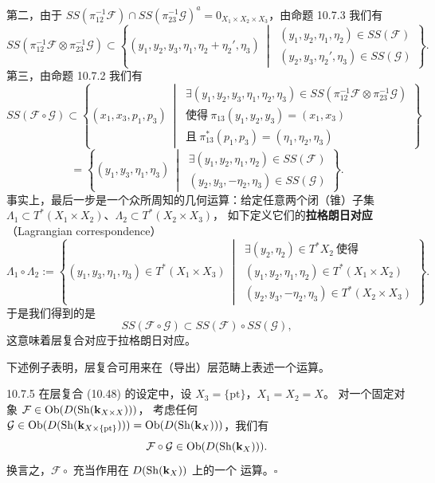 第二，由于 $SS(\pi_{12}^{-1}\mathcal F)\cap SS(\pi_{23}^{-1}\mathcal G)^a
=0_{X_1\times X_2\times X_3}$，由命题 10.7.3 我们有
\[
  SS(\pi_{12}^{-1}\mathcal F\otimes\pi_{23}^{-1}\mathcal G)\subset
  \left\{(y_1,y_2,y_3,\eta_1,\eta_2+\eta_2',\eta_3)\ \middle|\
  \begin{array}{l}
    (y_1,y_2,\eta_1,\eta_2)\in SS(\mathcal F)\\
    (y_2,y_3,\eta_2',\eta_3)\in SS(\mathcal G)
  \end{array}\right\}.
\]
第三，由命题 10.7.2 我们有
\[
  SS(\mathcal F\circ\mathcal G)\subset\left\{
  (x_1,x_3,p_1,p_3)\ \middle|\
  \begin{array}{l}
    \exists(y_1,y_2,y_3,\eta_1,\eta_2,\eta_3)
    \in SS(\pi_{12}^{-1}\mathcal F\otimes\pi_{23}^{-1}\mathcal G)\\
    \text{使得}\ \pi_{13}(y_1,y_2,y_3)=(x_1,x_3)\\
    \text{且}\ \pi_{13}^*(p_1,p_3)=(\eta_1,\eta_2,\eta_3)
  \end{array}\right\}
\]
\[
  =\left\{(y_1,y_3,\eta_1,\eta_3)\ \middle|\
  \begin{array}{l}
    \exists(y_1,y_2,\eta_1,\eta_2)\in SS(\mathcal F)\\
    (y_2,y_3,-\eta_2,\eta_3)\in SS(\mathcal G)
  \end{array}\right\}.
\]
事实上，最后一步是一个众所周知的几何运算：给定任意两个闭（锥）子集
$\Lambda_1\subset T^*(X_1\times X_2)$、$\Lambda_2\subset T^*(X_2\times X_3)$，
如下定义它们的\textbf{拉格朗日对应}（Lagrangian correspondence）
\begin{equation}\tag{10.49}
  \Lambda_1\circ\Lambda_2:=\left\{
  (y_1,y_3,\eta_1,\eta_3)\in T^*(X_1\times X_3)\ \middle|\
  \begin{array}{l}
    \exists(y_2,\eta_2)\in T^*X_2\ \text{使得}\\
    (y_1,y_2,\eta_1,\eta_2)\in T^*(X_1\times X_2)\\
    (y_2,y_3,-\eta_2,\eta_3)\in T^*(X_2\times X_3)
  \end{array}\right\}.
\end{equation}
于是我们得到的是
\begin{equation}\tag{10.50}
  SS(\mathcal F\circ\mathcal G)\subset SS(\mathcal F)\circ SS(\mathcal G),
\end{equation}
这意味着层复合对应于拉格朗日对应。

下述例子表明，层复合可用来在（导出）层范畴上表述一个运算。

\begin{wexam}{10.7.5}
  在层复合 (10.48) 的设定中，设 $X_3=\{\mathrm{pt}\}$，$X_1=X_2=X$。
  对一个固定对象 $\mathcal F\in\operatorname{Ob}(D(\operatorname{Sh}(\mathbf{k}_{X\times X})))$，
  考虑任何 $\mathcal G\in\operatorname{Ob}(D(\operatorname{Sh}(\mathbf{k}_{X\times\{\mathrm{pt}\}})))
  =\operatorname{Ob}(D(\operatorname{Sh}(\mathbf{k}_X)))$，我们有
  \[
    \mathcal F\circ\mathcal G\in\operatorname{Ob}(D(\operatorname{Sh}(\mathbf{k}_X))).
  \]
  换言之，$\mathcal F\circ$ 充当作用在 $D(\operatorname{Sh}(\mathbf{k}_X))$ 上的一个
  运算。\hfill$\square$
\end{wexam}

